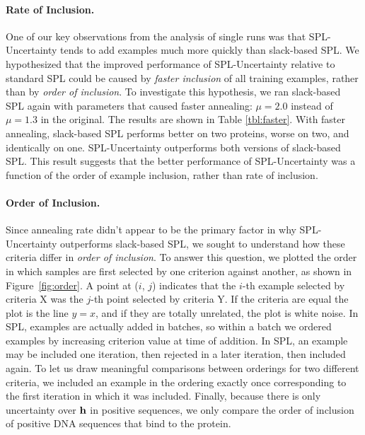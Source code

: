 \documentclass{article}
\begin{document}
\paragraph{Rate of Inclusion.} One of our key observations from the analysis of single runs was that SPL-Uncertainty tends to add examples much more quickly than slack-based SPL. We hypothesized that the improved performance of SPL-Uncertainty relative to standard SPL could be caused by  \emph{faster inclusion} of all training examples, rather than by \emph{order of inclusion}.  To investigate this hypothesis, we ran slack-based SPL again with parameters that caused faster annealing: $\mu=2.0$ instead of $\mu=1.3$ in the original.  The results are shown in Table \ref{tbl:faster}.  With faster annealing, slack-based SPL performs better on two proteins, worse on two, and identically on one. SPL-Uncertainty outperforms both versions of slack-based SPL.  This result suggests that the better performance of SPL-Uncertainty was a function of the order of example inclusion, rather than rate of inclusion.

\paragraph{Order of Inclusion.} Since annealing rate didn't appear to be the primary factor in why SPL-Uncertainty outperforms slack-based SPL, we sought to understand how these criteria differ in \emph{order of inclusion}. To answer this question, we plotted the order in which samples are first selected by one criterion against another, as shown in Figure~\ref{fig:order}. A point at ($i$, $j$) indicates that the $i$-th example selected by criteria {\sc X} was the $j$-th point selected by criteria {\sc Y}.  If the criteria are equal the plot is the line $y=x$, and if they are totally unrelated, the plot is white noise.  In SPL, examples are actually added in batches, so within a batch we ordered examples by increasing criterion value at time of addition.  In SPL, an example may be included one iteration, then rejected in a later iteration, then included again.  To let us draw meaningful comparisons between orderings for two different criteria, we included an example in the ordering exactly once corresponding to the first iteration in which it was included.  Finally, because there is only uncertainty over $\bf h$ in positive sequences, we only compare the order of inclusion of positive DNA sequences that bind to the protein.
\end{document}
